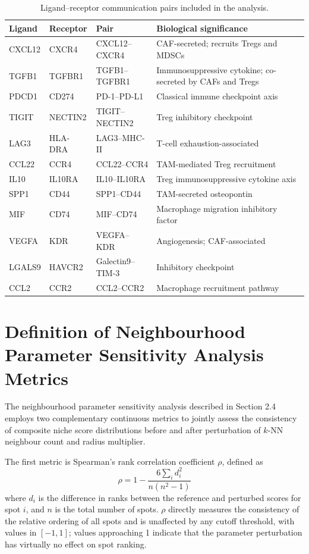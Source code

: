 \documentclass[12pt, a4paper]{article}
\begin{document}
\begin{table}[H]
\centering
\caption{Ligand--receptor communication pairs included in the analysis.}
\label{tab:lr_pairs}
\begin{tabularx}{\textwidth}{lllX}
\toprule
\textbf{Ligand} & \textbf{Receptor} & \textbf{Pair} & \textbf{Biological significance} \\
\midrule
CXCL12 & CXCR4   & CXCL12--CXCR4  & CAF-secreted; recruits Tregs and MDSCs \\
TGFB1  & TGFBR1  & TGFB1--TGFBR1  & Immunosuppressive cytokine; co-secreted by CAFs and Tregs \\
PDCD1  & CD274   & PD-1--PD-L1    & Classical immune checkpoint axis \\
TIGIT  & NECTIN2 & TIGIT--NECTIN2 & Treg inhibitory checkpoint \\
LAG3   & HLA-DRA & LAG3--MHC-II   & T-cell exhaustion-associated \\
CCL22  & CCR4    & CCL22--CCR4    & TAM-mediated Treg recruitment \\
IL10   & IL10RA  & IL10--IL10RA   & Treg immunosuppressive cytokine axis \\
SPP1   & CD44    & SPP1--CD44     & TAM-secreted osteopontin \\
MIF    & CD74    & MIF--CD74      & Macrophage migration inhibitory factor \\
VEGFA  & KDR     & VEGFA--KDR     & Angiogenesis; CAF-associated \\
LGALS9 & HAVCR2  & Galectin9--TIM-3 & Inhibitory checkpoint \\
CCL2   & CCR2    & CCL2--CCR2     & Macrophage recruitment pathway \\
\bottomrule
\end{tabularx}
\end{table}

\section{Definition of Neighbourhood Parameter Sensitivity Analysis Metrics}
\label{app:sensitivity}

The neighbourhood parameter sensitivity analysis described in Section 2.4 employs two complementary continuous metrics to jointly assess the consistency of composite niche score distributions before and after perturbation of $k$-NN neighbour count and radius multiplier.

The first metric is Spearman's rank correlation coefficient $\rho$, defined as
\begin{equation}
\rho = 1 - \frac{6 \sum_i d_i^2}{n(n^2-1)}
\label{eq:spearman}
\end{equation}
where $d_i$ is the difference in ranks between the reference and perturbed scores for spot $i$, and $n$ is the total number of spots. $\rho$ directly measures the consistency of the relative ordering of all spots and is unaffected by any cutoff threshold, with values in $[-1, 1]$; values approaching 1 indicate that the parameter perturbation has virtually no effect on spot ranking.
\end{document}
